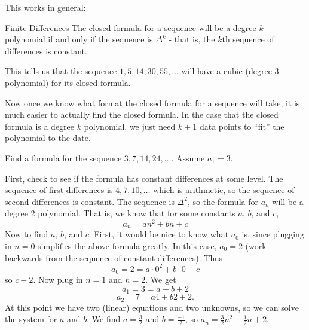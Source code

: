 \documentclass[12pt]{article}
\begin{document}
This works in general:

\begin{defbox}{Finite Differences}
The closed formula for a sequence will be a degree $k$ polynomial if and only if the sequence is $\Delta^k$ - that is, the $k$th sequence of differences is constant.
\end{defbox}

This tells us that the sequence $1, 5, 14, 30, 55, \ldots$ will have a cubic (degree 3 polynomial) for its closed formula.  

Now once we know what format the closed formula for a sequence will take, it is much easier to actually find the closed formula.  In the case that the closed formula is a degree $k$ polynomial, we just need $k+1$ data points to ``fit'' the polynomial to the date.

\begin{example}
  Find a formula for the sequence $3, 7, 14, 24,\ldots$. Assume $a_1 = 3$.  
  \begin{solution}
    First, check to see if the formula has constant differences at some level.  The sequence of first differences is $4, 7, 10, \ldots$ which is arithmetic, so the sequence of second differences is constant.  The sequence is $\Delta^2$, so the formula for $a_n$ will be a degree 2 polynomial.  That is, we know that for some constants $a$, $b$, and $c$,
    \[a_n = an^2 + bn + c\]
    Now to find $a$, $b$, and $c$.  First, it would be nice to know what $a_0$ is, since plugging in $n = 0$ simplifies the above formula greatly.  In this case, $a_0 = 2$ (work backwards from the sequence of constant differences).  Thus
    \[a_0 = 2 = a\cdot 0^2 + b \cdot 0 + c\]
    so $c - 2$.  Now plug in $n =1$ and $n = 2$.  We get 
    \[a_1 = 3 = a + b + 2\]
    \[a_2 = 7 = a4 + b 2 + 2.\]  At this point we have two (linear) equations and two unknowns, so we can solve the system for $a$ and $b$.  We find $a = \frac{3}{2}$ and $b = \frac{-1}{2}$, so $a_n = \frac{3}{2} n^2 - \frac{1}{2}n + 2$.
  \end{solution}

\end{example}
\end{document}
